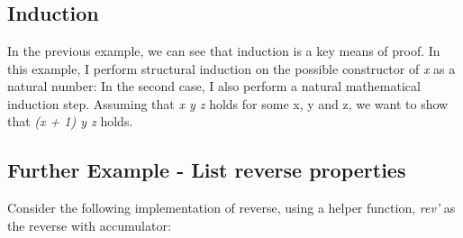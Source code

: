 \documentclass[12pt,twoside,notitlepage]{report}
\begin{document}
\begin{code}
\>[0]\<[2]%
\>[2] \AgdaSymbol{:} \AgdaSymbol{(}   \AgdaSymbol{:} \AgdaSymbol{)}  \AgdaSymbol{(} \AgdaPrimitive{+} \AgdaSymbol{(} \AgdaPrimitive{+} \AgdaSymbol{))}  \AgdaSymbol{((} \AgdaPrimitive{+} \AgdaSymbol{)} \AgdaPrimitive{+} \AgdaSymbol{)}\<%
\\
\>[0]\<[2]%
\>[2]    \AgdaSymbol{=} \<%
\\
\>[0]\<[2]%
\>[2] \AgdaSymbol{(} \AgdaSymbol{)}        \AgdaSymbol{=} \<%
\\
\end{code}

\subsection{Induction}

In the previous example, we can see that induction is a key means of proof. In this example, I perform structural induction on the possible constructor of \textit{x} as a natural number:
 In the second case, I also perform a natural mathematical induction step. Assuming that  \textit{x y z} holds for some x, y and z, we want to show that  \textit{(x + 1) y z} holds.

\subsection{Further Example - List reverse properties}
Consider the following implementation of reverse, using a helper function, \textit{rev'} as the reverse with accumulator: 
\end{document}
